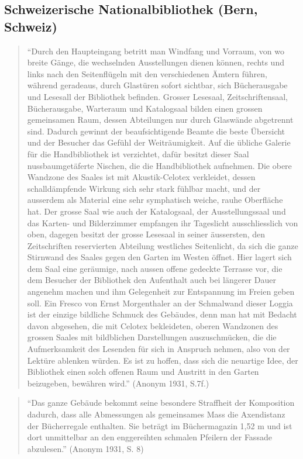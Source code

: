 \documentclass[a4paper,
fontsize=11pt,
oneside,
numbers=noperiodatend,
parskip=half-,
bibliography=totoc,
final
]{scrartcl}
\begin{document}
\subsection*{Schweizerische Nationalbibliothek (Bern,
Schweiz)}\label{schweizerische-nationalbibliothek-bern-schweiz}

\begin{quote}
\enquote{Durch den Haupteingang betritt man Windfang und Vorraum, von wo
breite Gänge, die wechselnden Ausstellungen dienen können, rechts und
links nach den Seitenflügeln mit den verschiedenen Ämtern führen,
während geradeaus, durch Glastüren sofort sichtbar, sich Bücherausgabe
und Lesesall der Bibliothek befinden. Grosser Lesesaal,
Zeitschriftensaal, Bücherausgabe, Warteraum und Katalogsaal bilden einen
grossen gemeinsamen Raum, dessen Abteilungen nur durch Glaswände
abgetrennt sind. Dadurch gewinnt der beaufsichtigende Beamte die beste
Übersicht und der Besucher das Gefühl der Weiträumigkeit. Auf die
übliche Galerie für die Handbibliothek ist verzichtet, dafür besitzt
dieser Saal nussbaumgetäferte Nischen, die die Handbibliothek aufnehmen.
Die obere Wandzone des Saales ist mit Akustik-Celotex verkleidet, dessen
schalldämpfende Wirkung sich sehr stark fühlbar macht, und der ausserdem
als Material eine sehr symphatisch weiche, rauhe Oberfläche hat. Der
grosse Saal wie auch der Katalogsaal, der Ausstellungssaal und das
Karten- und Bilderzimmer empfangen ihr Tageslicht ausschliesslich von
oben, dagegen besitzt der grosse Lesesaal in seiner äussersten, den
Zeitschriften reservierten Abteilung westliches Seitenlicht, da sich die
ganze Stirnwand des Saales gegen den Garten im Westen öffnet. Hier
lagert sich dem Saal eine geräumige, nach aussen offene gedeckte
Terrasse vor, die dem Besucher der Bibliothek den Aufenthalt auch bei
längerer Dauer angenehm machen und ihm Gelegenheit zur Entspannung im
Freien geben soll. Ein Fresco von Ernst Morgenthaler an der Schmalwand
dieser Loggia ist der einzige bildliche Schmuck des Gebäudes, denn man
hat mit Bedacht davon abgesehen, die mit Celotex bekleideten, oberen
Wandzonen des grossen Saales mit bildblichen Darstellungen
auszuschmücken, die die Aufmerksamkeit des Lesenden für sich in Anspruch
nehmen, also von der Lektüre ablenken würden. Es ist zu hoffen, dass
sich die neuartige Idee, der Bibliothek einen solch offenen Raum und
Austritt in den Garten beizugeben, bewähren wird.} (Anonym 1931, S.7f.)
\end{quote}

\begin{quote}
\enquote{Das ganze Gebäude bekommt seine besondere Straffheit der
Komposition dadurch, dass alle Abmessungen als gemeinsames Mass die
Axendistanz der Bücherregale enthalten. Sie beträgt im Büchermagazin
1,52 m und ist dort unmittelbar an den enggereihten schmalen Pfeilern
der Fassade abzulesen.} (Anonym 1931, S. 8)
\end{quote}
\end{document}
